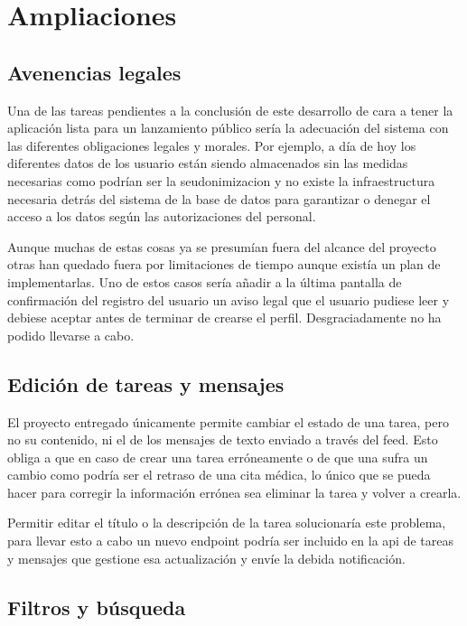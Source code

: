 \chapter{Ampliaciones}
\label{ch:ampliaciones}

\section{Avenencias legales}
\label{sec:avenencia_legal}

Una de las tareas pendientes a la conclusión de este desarrollo de cara a tener la aplicación lista para un lanzamiento público sería la adecuación del sistema con las diferentes obligaciones legales y morales. Por ejemplo, a día de hoy los diferentes datos de los usuario están siendo almacenados sin las medidas necesarias como podrían ser la \gls{seudonimizacion} y no existe la infraestructura necesaria detrás del sistema de la base de datos para garantizar o denegar el acceso a los datos según las autorizaciones del personal.

Aunque muchas de estas cosas ya se presumían fuera del alcance del proyecto otras han quedado fuera por limitaciones de tiempo aunque existía un plan de implementarlas. Uno de estos casos sería añadir a la última pantalla de confirmación del registro del usuario un aviso legal que el usuario pudiese leer y debiese aceptar antes de terminar de crearse el perfil. Desgraciadamente no ha podido llevarse a cabo.

\section{Edición de tareas y mensajes}

El proyecto entregado únicamente permite cambiar el estado de una tarea, pero no su contenido, ni el de los mensajes de texto enviado a través del feed. Esto obliga a que en caso de crear una tarea erróneamente o de que una sufra un cambio como podría ser el retraso de una cita médica, lo único que se pueda hacer para corregir la información errónea sea eliminar la tarea y volver a crearla. 

Permitir editar el título o la descripción de la tarea solucionaría este problema, para llevar esto a cabo un nuevo \gls{endpoint} podría ser incluido en la \acrshort{api} de tareas y mensajes que gestione esa actualización y envíe la debida notificación.

\section{Filtros y búsqueda}

